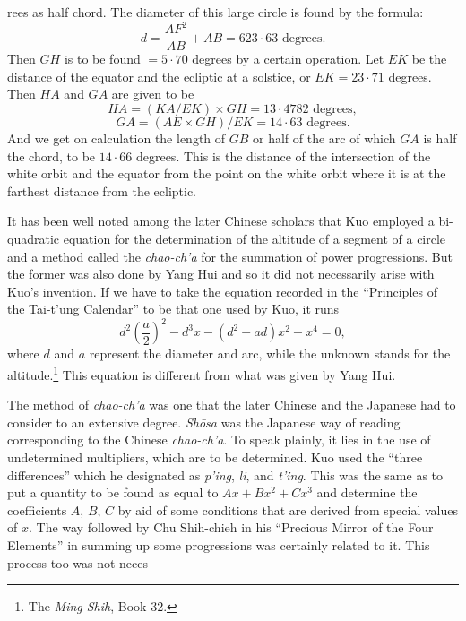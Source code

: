 \documentclass[11pt]{article}
\newcommand{\scanpage}[2]{\clearpage\setcounter{footnote}{0}\noindent{\footnotesize\color{gray}PDF page #1 · #2}\par\medskip}
\newcommand{\scanfooter}{}
\begin{document}
\scanpage{0117}{Chapter 15, printed page 103}
\setcounter{footnote}{0}
rees as half chord. The diameter of this large circle is found by the formula:
\[
d=\frac{AF^2}{AB}+AB=623{\cdot}63\text{ degrees}.
\]
Then $GH$ is to be found $=5{\cdot}70$ degrees by a certain operation. Let $EK$ be the distance of the equator and the ecliptic at a solstice, or $EK=23{\cdot}71$ degrees. Then $HA$ and $GA$ are given to be
\[
HA=(KA/EK)\times GH=13{\cdot}4782\text{ degrees},
\]
\[
GA=(AE\times GH)/EK=14{\cdot}63\text{ degrees}.
\]
And we get on calculation the length of $GB$ or half of the arc of which $GA$ is half the chord, to be $14{\cdot}66$ degrees. This is the distance of the intersection of the white orbit and the equator from the point on the white orbit where it is at the farthest distance from the ecliptic.

It has been well noted among the later Chinese scholars that Kuo employed a bi-quadratic equation for the determination of the altitude of a segment of a circle and a method called the \emph{chao-ch'a} for the summation of power progressions. But the former was also done by Yang Hui and so it did not necessarily arise with Kuo's invention. If we have to take the equation recorded in the ``Principles of the Tai-t'ung Calendar'' to be that one used by Kuo, it runs
\[
d^2\left(\frac{a}{2}\right)^2-d^3x-(d^2-ad)x^2+x^4=0,
\]
where $d$ and $a$ represent the diameter and arc, while the unknown stands for the altitude.\footnote{The \emph{Ming-Shih}, Book 32.} This equation is different from what was given by Yang Hui.

The method of \emph{chao-ch'a} was one that the later Chinese and the Japanese had to consider to an extensive degree. \emph{Shōsa} was the Japanese way of reading corresponding to the Chinese \emph{chao-ch'a}. To speak plainly, it lies in the use of undetermined multipliers, which are to be determined. Kuo used the ``three differences'' which he designated as \emph{p'ing}, \emph{li}, and \emph{t'ing}. This was the same as to put a quantity to be found as equal to $Ax+Bx^2+Cx^3$ and determine the coefficients $A$, $B$, $C$ by aid of some conditions that are derived from special values of $x$. The way followed by Chu Shih-chieh in his ``Precious Mirror of the Four Elements'' in summing up some progressions was certainly related to it. This process too was not neces-
\scanfooter
\end{document}
